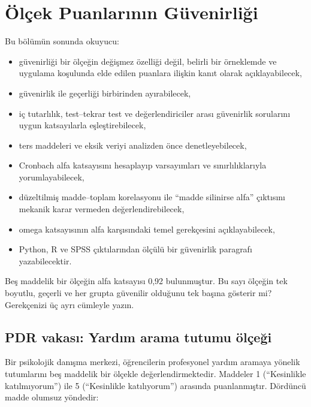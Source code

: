 \chapter{Ölçek Puanlarının Güvenirliği}
\label{ch:reliability}

\begin{hedefler}
Bu bölümün sonunda okuyucu:
\begin{itemize}
  \item güvenirliği bir ölçeğin değişmez özelliği değil, belirli bir örneklemde
  ve uygulama koşulunda elde edilen puanlara ilişkin kanıt olarak açıklayabilecek,
  \item güvenirlik ile geçerliği birbirinden ayırabilecek,
  \item iç tutarlılık, test--tekrar test ve değerlendiriciler arası güvenirlik
  sorularını uygun katsayılarla eşleştirebilecek,
  \item ters maddeleri ve eksik veriyi analizden önce denetleyebilecek,
  \item Cronbach alfa katsayısını hesaplayıp varsayımları ve sınırlılıklarıyla
  yorumlayabilecek,
  \item düzeltilmiş madde--toplam korelasyonu ile ``madde silinirse alfa''
  çıktısını mekanik karar vermeden değerlendirebilecek,
  \item omega katsayısının alfa karşısındaki temel gerekçesini açıklayabilecek,
  \item Python, R ve SPSS çıktılarından ölçülü bir güvenirlik paragrafı
  yazabilecektir.
\end{itemize}
\end{hedefler}

\begin{hazirlik}
Beş maddelik bir ölçeğin alfa katsayısı 0,92 bulunmuştur. Bu sayı ölçeğin tek
boyutlu, geçerli ve her grupta güvenilir olduğunu tek başına gösterir mi?
Gerekçenizi üç ayrı cümleyle yazın.
\end{hazirlik}

\section{PDR vakası: Yardım arama tutumu ölçeği}

Bir psikolojik danışma merkezi, öğrencilerin profesyonel yardım aramaya yönelik
tutumlarını beş maddelik bir ölçekle değerlendirmektedir. Maddeler 1
(``Kesinlikle katılmıyorum'') ile 5 (``Kesinlikle katılıyorum'') arasında
puanlanmıştır. Dördüncü madde olumsuz yöndedir:

